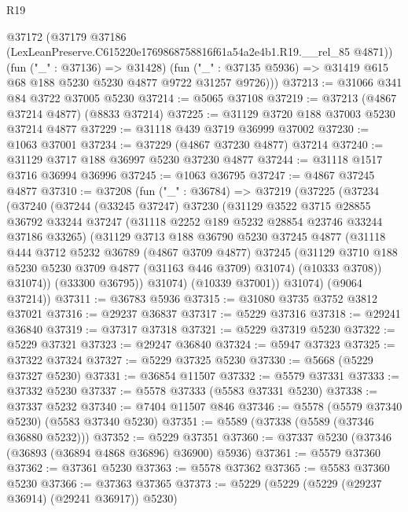 \begin{lexlean}{R19}
\begin{coremodule}
      @37172
        (@37179 @37186 (LexLeanPreserve.C615220e1769868758816f61a54a2e4b1.R19.__rel_85 @4871))
        (fun ("_" : @37136) => @31428)
        (fun ("_" : @37135 @5936) => @31419 @615 @68 @188 @5230 @5230 @4877 @9722 @31257 @9726)))
@37213 := @31066 @341 @84 @3722 @37005 @5230
@37214 := @5065 @37108
@37219 := @37213 (@4867 @37214 @4877) (@8833 @37214)
@37225 := @31129 @3720 @188 @37003 @5230 @37214 @4877
@37229 := @31118 @439 @3719 @36999 @37002
@37230 := @1063 @37001
@37234 := @37229 (@4867 @37230 @4877) @37214
@37240 := @31129 @3717 @188 @36997 @5230 @37230 @4877
@37244 := @31118 @1517 @3716 @36994 @36996
@37245 := @1063 @36795
@37247 := @4867 @37245 @4877
@37310 := @37208
    (fun ("_" : @36784) =>
    @37219
      (@37225
        (@37234
          (@37240
            (@37244
              (@33245 @37247)
              @37230
              (@31129
                @3522
                @3715
                @28855
                @36792
                @33244
                @37247
                (@31118 @2252 @189 @5232 @28854 @23746 @33244 @37186 @33265)
                (@31129
                  @3713
                  @188
                  @36790
                  @5230
                  @37245
                  @4877
                  (@31118
                    @444
                    @3712
                    @5232
                    @36789
                    (@4867 @3709 @4877)
                    @37245
                    (@31129 @3710 @188 @5230 @5230 @3709 @4877 (@31163 @446 @3709) @31074)
                    (@10333 @3708))
                  @31074))
              (@33300 @36795))
            @31074)
          (@10339 @37001))
        @31074)
      (@9064 @37214))
@37311 := @36783 @5936
@37315 := @31080 @3735 @3752 @3812 @37021
@37316 := @29237 @36837
@37317 := @5229 @37316
@37318 := @29241 @36840
@37319 := @37317 @37318
@37321 := @5229 @37319 @5230
@37322 := @5229 @37321
@37323 := @29247 @36840
@37324 := @5947 @37323
@37325 := @37322 @37324
@37327 := @5229 @37325 @5230
@37330 := @5668 (@5229 @37327 @5230)
@37331 := @36854 @11507
@37332 := @5579 @37331
@37333 := @37332 @5230
@37337 := @5578 @37333 (@5583 @37331 @5230)
@37338 := @37337 @5232
@37340 := @7404 @11507 @846
@37346 := @5578 (@5579 @37340 @5230) (@5583 @37340 @5230)
@37351 := @5589 (@37338 (@5589 (@37346 @36880 @5232)))
@37352 := @5229 @37351
@37360 := @37337 @5230 (@37346 (@36893 (@36894 @4868 @36896) @36900) @5936)
@37361 := @5579 @37360
@37362 := @37361 @5230
@37363 := @5578 @37362
@37365 := @5583 @37360 @5230
@37366 := @37363 @37365
@37373 := @5229 (@5229 (@5229 (@29237 @36914) (@29241 @36917)) @5230)

\end{coremodule}
\end{lexlean}
